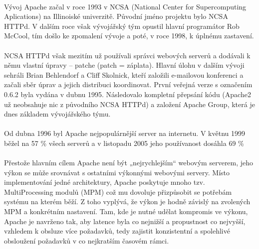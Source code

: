 \paragraph{}
Vývoj Apache začal v roce 1993 v NCSA (National Center for Supercomputing Aplications) na Illinoiské univerzitě. Původní jméno projektu bylo NCSA HTTPd. V dalším roce však vývojářský tým opustil hlavní programátor Rob McCool, tím došlo ke zpomalení vývoje a poté, v roce 1998, k úplnému zastavení.
\paragraph{}
NCSA HTTPd však mezitím už používali správci webových serverů a dodávali k němu vlastní úpravy – patche (patch = záplata). Hlavní úlohu v dalším vývoji sehráli Brian Behlendorf a Cliff Skolnick, kteří založili e-mailovou konferenci a začali sběr úprav a jejich distribuci koordinovat. První veřejná verze s označením 0.6.2 byla vydána v dubnu 1995. Následovalo kompletní přepsání kódu (Apache2 už neobsahuje nic z původního NCSA HTTPd) a založení Apache Group, která je dnes základem vývojářského týmu.
\paragraph{}
Od dubna 1996 byl Apache nejpopulárnější server na internetu. V květnu 1999 běžel na 57 \% všech serverů a v listopadu 2005 jeho používanost dosáhla 69 \%
\paragraph{}
Přestože hlavním cílem Apache není být „nejrychlejším“ webovým serverem, jeho výkon se může srovnávat s ostatními výkonnými webovými servery. Místo implementování jedné architektury, Apache poskytuje mnoho tzv. MultiProcessing modulů (MPM) což mu dovoluje přizpůsobit se potřebám systému na kterém běží. Z toho vyplývá, že výkon je hodně závislý na zvolených MPM a konkrétním nastavení. Tam, kde je nutné udělat kompromis ve výkonu, Apache je navrženo tak, aby latence byla co nejnižší a propustnost co nejvyšší, vzhledem k obsluze více požadavků, tedy zajistit konzistentní a spolehlivé obsloužení požadavků v co nejkratším časovém rámci.